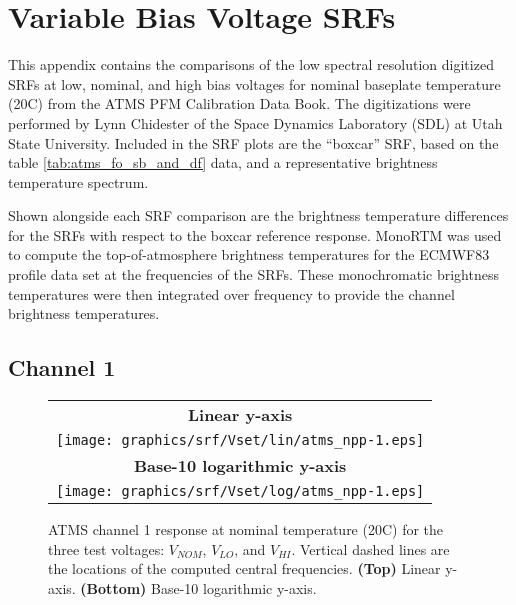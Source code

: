 \section{Variable Bias Voltage SRFs}
\label{app:Vset}
This appendix contains the comparisons of the low spectral resolution digitized SRFs at low, nominal, and high bias voltages for nominal baseplate temperature (20\textdegree{}C) from the ATMS PFM Calibration Data Book\cite{ATMS_PFM_CalLog}. The digitizations were performed by Lynn Chidester of the Space Dynamics Laboratory (SDL) at Utah State University. Included in the SRF plots are the ``boxcar'' SRF, based on the table \ref{tab:atms_fo_sb_and_df} data, and a representative brightness temperature spectrum.

Shown alongside each SRF comparison are the brightness temperature differences for the SRFs with respect to the boxcar reference response. MonoRTM \cite{Clough_2005} was used to compute the top-of-atmosphere brightness temperatures for the ECMWF83 profile data set \cite{ECMWF_profile_set2,Matricardi_ECMWF564} at the frequencies of the SRFs. These monochromatic brightness temperatures were then integrated over frequency to provide the channel brightness temperatures.

\newpage

\subsection{Channel 1}
\begin{figure}[H]
  \label{fig:Vset.ch1_response}
  \centering
  \begin{tabular}{c}
    \hspace{1.75cm}\sffamily\textbf{Linear y-axis} \\
    \texttt{[image: graphics/srf/Vset/lin/atms\_npp-1.eps]} \\
    \hspace{1.75cm}\sffamily\textbf{Base-10 logarithmic y-axis} \\
    \texttt{[image: graphics/srf/Vset/log/atms\_npp-1.eps]}
  \end{tabular}
  \caption{ATMS channel 1 response at nominal temperature (20\textdegree{}C) for the three test voltages: $V_{NOM}$, $V_{LO}$, and $V_{HI}$. Vertical dashed lines are the locations of the computed central frequencies. \textbf{(Top)} Linear y-axis. \textbf{(Bottom)} Base-10 logarithmic y-axis.}
\end{figure}

